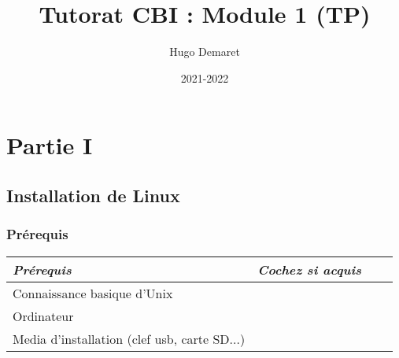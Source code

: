 \documentclass{article}
\title{Tutorat CBI : Module 1 (TP)}
\author{Hugo Demaret}
\date{2021-2022}
\begin{document}
\maketitle
    \section*{Partie I}
        \subsection*{Installation de Linux}
            \subsubsection*{Prérequis}
                \begin{table}[h]
                    \begin{tabular}{|l|c|c|p{5cm}}
                        \hline
                        \textit{Prérequis}&\textit{Cochez si acquis}\\
                        \hline
                        \hline
                        \textrm{Connaissance basique d'Unix}&\\
                        \hline
                        \textrm{Ordinateur}&\\
                        \hline
                        \textrm{Media d'installation (clef usb, carte SD...)}&\\
                        \hline
                    \end{tabular}
                \end{table}
\end{document}
